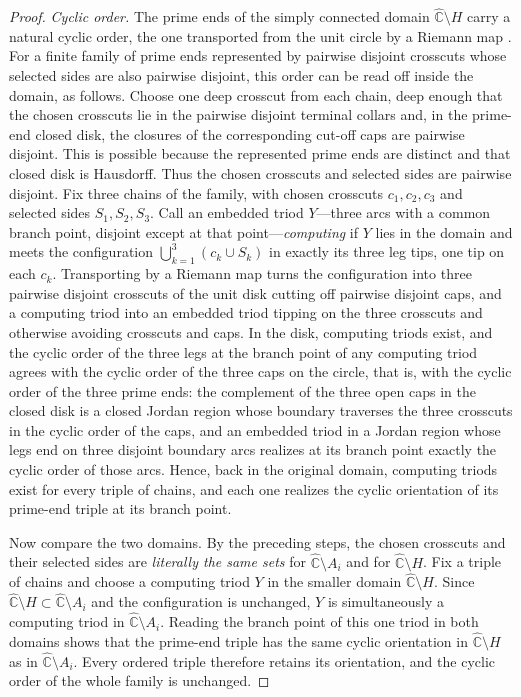 \documentclass[11pt,reqno]{amsart}
\theoremstyle{definition}
\theoremstyle{remark}
\newcommand{\Chat}{\widehat{\mathbb C}}
\begin{document}
\begin{proof}
\emph{Cyclic order.}
The prime ends of the simply connected domain $\Chat\setminus H$ carry a
natural cyclic order, the one transported from the unit circle by a
Riemann map \cite{Pom92}.  For a finite family of prime ends represented
by pairwise disjoint crosscuts whose selected sides are also pairwise
disjoint, this order can be read off inside the domain, as follows.
Choose one deep crosscut from each chain, deep enough that the chosen
crosscuts lie in the pairwise disjoint terminal collars and, in the
prime-end closed disk, the closures of the corresponding cut-off caps are
pairwise disjoint.  This is possible because the represented prime ends
are distinct and that closed disk is Hausdorff.  Thus the chosen crosscuts
and selected sides are pairwise disjoint.  Fix three chains of the family, with chosen crosscuts
$c_1,c_2,c_3$ and selected sides $S_1,S_2,S_3$.  Call an embedded triod
$Y$---three arcs with a common branch point, disjoint except at that
point---\emph{computing} if $Y$ lies in the domain and meets the
configuration $\bigcup_{k=1}^{3}(c_k\cup S_k)$ in exactly its three leg
tips, one tip on each $c_k$.  Transporting by a Riemann map turns the
configuration into three pairwise disjoint crosscuts of the unit disk
cutting off pairwise disjoint caps, and a computing triod into an
embedded triod tipping on the three crosscuts and otherwise avoiding
crosscuts and caps.  In the disk, computing triods exist, and the cyclic
order of the three legs at the branch point of any computing triod
agrees with the cyclic order of the three caps on the circle, that is,
with the cyclic order of the three prime ends: the complement of the
three open caps in the closed disk is a closed Jordan region whose
boundary traverses the three crosscuts in the cyclic order of the caps,
and an embedded triod in a Jordan region whose legs end on three
disjoint boundary arcs realizes at its branch point exactly the cyclic
order of those arcs.  Hence, back in the original domain, computing
triods exist for every triple of chains, and each one realizes the
cyclic orientation of its prime-end triple at its branch point.

Now compare the two domains.  By the preceding steps, the chosen
crosscuts and their selected sides are \emph{literally the same sets}
for $\Chat\setminus A_i$ and for $\Chat\setminus H$.  Fix a triple of
chains and choose a computing triod $Y$ in the smaller domain
$\Chat\setminus H$.  Since $\Chat\setminus H\subset\Chat\setminus A_i$
and the configuration is unchanged, $Y$ is simultaneously a computing
triod in $\Chat\setminus A_i$.  Reading the branch point of this one
triod in both domains shows that the prime-end triple has the same
cyclic orientation in $\Chat\setminus H$ as in $\Chat\setminus A_i$.
Every ordered triple therefore retains its orientation, and the cyclic
order of the whole family is unchanged.
\end{proof}
\end{document}
